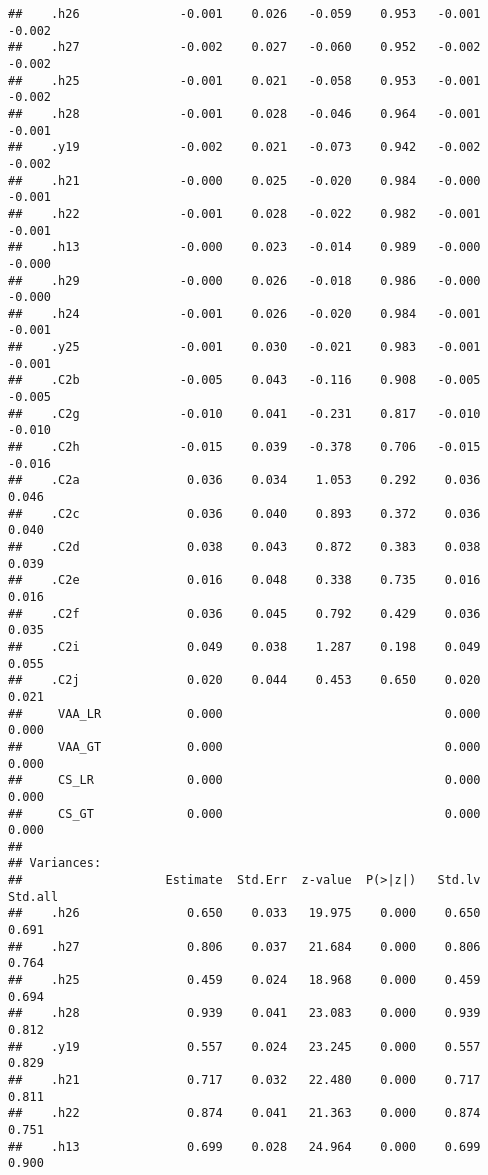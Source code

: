 \documentclass[
]{article}
\begin{document}
\begin{verbatim}
##    .h26              -0.001    0.026   -0.059    0.953   -0.001   -0.002
##    .h27              -0.002    0.027   -0.060    0.952   -0.002   -0.002
##    .h25              -0.001    0.021   -0.058    0.953   -0.001   -0.002
##    .h28              -0.001    0.028   -0.046    0.964   -0.001   -0.001
##    .y19              -0.002    0.021   -0.073    0.942   -0.002   -0.002
##    .h21              -0.000    0.025   -0.020    0.984   -0.000   -0.001
##    .h22              -0.001    0.028   -0.022    0.982   -0.001   -0.001
##    .h13              -0.000    0.023   -0.014    0.989   -0.000   -0.000
##    .h29              -0.000    0.026   -0.018    0.986   -0.000   -0.000
##    .h24              -0.001    0.026   -0.020    0.984   -0.001   -0.001
##    .y25              -0.001    0.030   -0.021    0.983   -0.001   -0.001
##    .C2b              -0.005    0.043   -0.116    0.908   -0.005   -0.005
##    .C2g              -0.010    0.041   -0.231    0.817   -0.010   -0.010
##    .C2h              -0.015    0.039   -0.378    0.706   -0.015   -0.016
##    .C2a               0.036    0.034    1.053    0.292    0.036    0.046
##    .C2c               0.036    0.040    0.893    0.372    0.036    0.040
##    .C2d               0.038    0.043    0.872    0.383    0.038    0.039
##    .C2e               0.016    0.048    0.338    0.735    0.016    0.016
##    .C2f               0.036    0.045    0.792    0.429    0.036    0.035
##    .C2i               0.049    0.038    1.287    0.198    0.049    0.055
##    .C2j               0.020    0.044    0.453    0.650    0.020    0.021
##     VAA_LR            0.000                               0.000    0.000
##     VAA_GT            0.000                               0.000    0.000
##     CS_LR             0.000                               0.000    0.000
##     CS_GT             0.000                               0.000    0.000
## 
## Variances:
##                    Estimate  Std.Err  z-value  P(>|z|)   Std.lv  Std.all
##    .h26               0.650    0.033   19.975    0.000    0.650    0.691
##    .h27               0.806    0.037   21.684    0.000    0.806    0.764
##    .h25               0.459    0.024   18.968    0.000    0.459    0.694
##    .h28               0.939    0.041   23.083    0.000    0.939    0.812
##    .y19               0.557    0.024   23.245    0.000    0.557    0.829
##    .h21               0.717    0.032   22.480    0.000    0.717    0.811
##    .h22               0.874    0.041   21.363    0.000    0.874    0.751
##    .h13               0.699    0.028   24.964    0.000    0.699    0.900

\end{verbatim}
\end{document}
